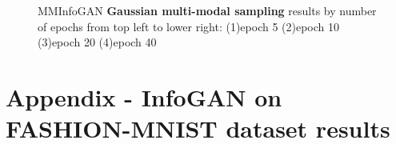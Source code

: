 \documentclass[letterpaper,12pt]{article}
\begin{document}
\begin{figure}[H]
    \hspace{10px}
    \caption{MMInfoGAN \textbf{Gaussian multi-modal sampling } results by number of epochs from top left to lower right: (1)epoch 5 (2)epoch 10 (3)epoch 20 (4)epoch 40}
\end{figure}




\section{Appendix - InfoGAN on FASHION-MNIST dataset results}
\begin{figure}[H]  
    \hspace{10px}
    \hspace{10px}

\end{figure}
\end{document}

